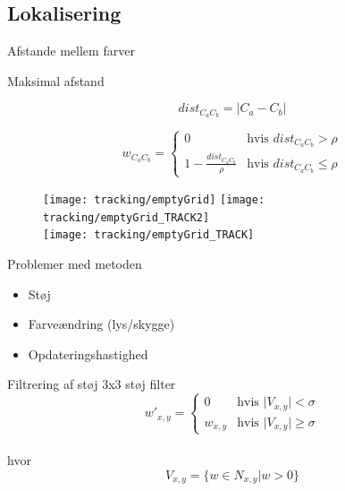 \subsection{Lokalisering}

\begin{frame}{Afstande mellem farver}

\centering


\end{frame}

\begin{frame}{Maksimal afstand}

$$dist_{C_aC_b} = \vert C_a - C_b \vert$$

$$w_{C_aC_b} = \begin{cases}
	0 &\text{hvis } dist_{C_aC_b} > \rho \\
	1 - \frac{dist_{C_aC_b}}{\rho} &\text{hvis } dist_{C_aC_b} \leq \rho
\end{cases}$$

\end{frame}

\begin{frame}

\begin{figure}
\centering
\texttt{[image: tracking/emptyGrid]}
\texttt{[image: tracking/emptyGrid\_TRACK2]} \\
\texttt{[image: tracking/emptyGrid\_TRACK]}

\end{figure}
\end{frame}

\begin{frame}{Problemer med metoden}
\begin{itemize}
\item Støj
\item Farveændring (lys/skygge)
\item Opdateringshastighed
\end{itemize}

\end{frame}



\begin{frame}{Filtrering af støj}
3x3 støj filter \\


$$w'_{x,y} = \begin{cases}
	0 &\text{hvis } \vert V_{x,y} \vert < \sigma \\
	w_{x,y} &\text{hvis } \vert V_{x,y} \vert \geq \sigma
\end{cases}$$ \\
hvor $$V_{x,y} = \{w \in N_{x,y} \vert w > 0 \}$$
\end{frame}

